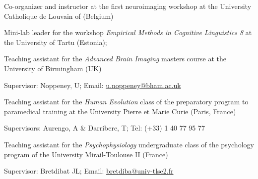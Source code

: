 
Co-organizer and instructor at the first neuroimaging workshop at the University Catholique de Louvain of (Belgium)

Mini-lab leader for the workshop \textit{Empirical Methods in Cognitive Linguistics 8} at the University of Tartu (Estonia);

Teaching assistant for the \textit{Advanced Brain Imaging} masters course at the University of Birmingham (UK)

Supervisor: Noppeney, U; Email: \href{mailto:u.noppeney@bham.ac.uk}{u.noppeney@bham.ac.uk}

Teaching assistant for the \textit{Human Evolution} class of the preparatory program to paramedical training at the University Pierre et Marie Curie (Paris, France)

Supervisors: Aurengo, A \& Darribere, T; Tel: (+33) 1 40 77 95 77

Teaching assistant for the \textit{Psychophysiology} undergraduate class of the psychology program of the University Mirail-Toulouse II (France)

Supervisor: Bretdibat JL; Email: \href{mailto:bretdiba@univ-tlse2.fr}{bretdiba@univ-tlse2.fr}
